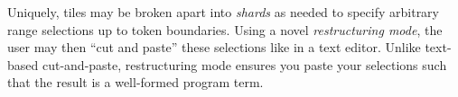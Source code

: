 Uniquely, tiles may be broken apart into
\emph{shards} as needed to specify arbitrary range
selections up to token boundaries.
Using a novel \emph{restructuring mode}, the user
may then ``cut and paste'' these selections like
in a text editor.
Unlike text-based cut-and-paste, restructuring
mode ensures you paste your selections such that
the result is a well-formed program term.




